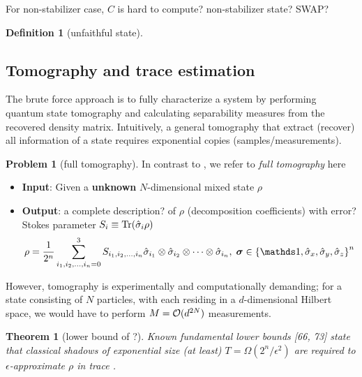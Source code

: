 \documentclass[
10pt,
aps,
pra,
linenumbers,
floatfix,
]{revtex4-2}
\theoremstyle{plain}
\newtheorem{theorem}{Theorem}
\newtheorem{question}{Question}
\theoremstyle{definition}
\newtheorem{definition}{Definition}
\newtheorem{problem}{Problem}
\newcommand{\dm}{\rho}
\begin{document}
For non-stabilizer case, \cite{zhangEfficientEntanglementGeneration2021} \cite{zhuMachineLearningDerivedEntanglement2021}
$C$ is hard to compute? non-stabilizer state? SWAP?

\cite{weilenmannEntanglementDetectionMeasuring2020,zhanDetectingEntanglementUnfaithful2021}
\begin{definition}[unfaithful state]\label{def:unfaithful_state}
\end{definition}



\subsection{Tomography and trace estimation}
The brute force approach is to fully characterize a system by performing quantum state tomography and calculating separability measures from the recovered density matrix.
Intuitively, a general tomography \cite{altepeterPhotonicStateTomography2005} that extract (recover) all information of a state requires exponential copies (samples/measurements).
\begin{problem}[full tomography]\label{prm:full_tomography}
	In contrast to , we refer to \emph{full tomography} here
	\begin{itemize}
		\item \textbf{Input}: Given a \textbf{unknown} $N$-dimensional mixed state $\dm$
		\item \textbf{Output}: a complete description? of $\dm$ (decomposition coefficients) with error?
		Stokes parameter $S_i\equiv \Tr(\hat{\sigma}_i \dm)$
		\begin{equation}\label{eq:stokes_tomography}
			\dm = \frac{1}{2^n} \sum_{i_1,i_2,\dots,i_n=0}^3
			S_{i_1,i_2,\dots,i_n} 
			\hat{\sigma}_{i_1} \otimes \hat{\sigma}_{i_2} \otimes \dots \otimes \hat{\sigma}_{i_n} 
			,\;
			\bm{\sigma}\in \qty{\identity,\sx,\sy,\sz}^n
		\end{equation}
	\end{itemize}
\end{problem}
However, tomography is experimentally and computationally demanding; for a state consisting of $N$ particles, with each residing in a $d$-dimensional Hilbert space, we would have to perform $M = \mathcal{O}(d^{2N})$ measurements.
\begin{theorem}[lower bound of ?\cite{haahSampleoptimalTomographyQuantum2017}]
	Known fundamental lower bounds [66, 73] state that classical shadows of exponential size (at least) $T = \Omega( 2^n / \epsilon^2)$ are required to $\epsilon$-approximate $\dm$ in trace .
\end{theorem}
\end{document}
